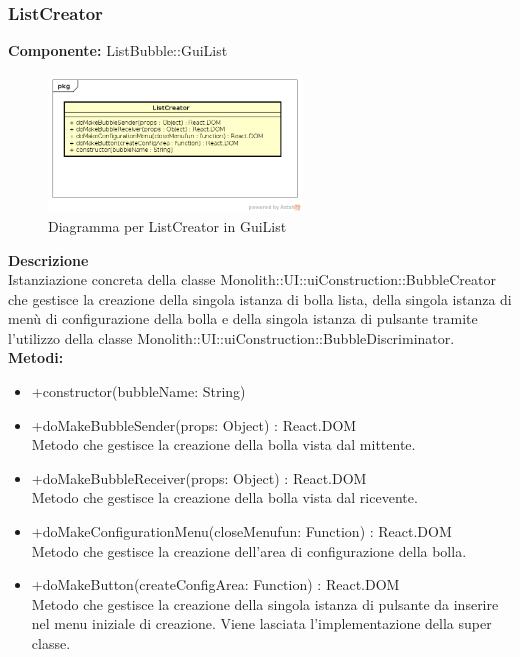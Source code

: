 \subsubsection{ListCreator}
\textbf{Componente:}  ListBubble::GuiList\\
   \FloatBarrier
   \begin{figure}[ht]
   \centering
   \includegraphics[width=0.6\textwidth]{img/single-ListCreator.png}
   \caption{{Diagramma per ListCreator in GuiList}}
\end{figure}
\FloatBarrier
\textbf{Descrizione}\\
Istanziazione concreta della classe Monolith::UI::uiConstruction::BubbleCreator che gestisce la creazione della singola istanza di bolla lista, della singola istanza di menù di configurazione della bolla e della singola istanza di pulsante tramite l'utilizzo della classe Monolith::UI::uiConstruction::BubbleDiscriminator.
\\
\textbf{Metodi:} 
\begin{itemize}
\item +constructor(bubbleName: String)
\item +doMakeBubbleSender(props: Object) : React.DOM 
\\
Metodo che gestisce la creazione della bolla vista dal mittente.
\item +doMakeBubbleReceiver(props: Object) : React.DOM 
\\
Metodo che gestisce la creazione della bolla vista dal ricevente.
\item +doMakeConfigurationMenu(closeMenufun: Function) : React.DOM  
\\
Metodo che gestisce la creazione dell'area di configurazione della bolla.
\item +doMakeButton(createConfigArea: Function) : React.DOM 
\\
Metodo che gestisce la creazione della singola istanza di pulsante da inserire nel menu iniziale di creazione. Viene lasciata l'implementazione della super classe.
\end{itemize} 



